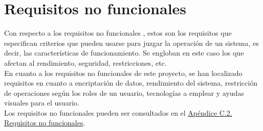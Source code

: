 \section{Requisitos no funcionales}

Con respecto a los requisitos no funcionales \cite{requisitos}, estos son los requisitos que especifican criterios que pueden usarse para juzgar la operación de un sistema, es decir, las características de funcionamiento. Se engloban en este caso los que afectan al rendimiento, seguridad, restricciones, etc. 
\\

En cuanto a los requisitos no funcionales de este proyecto, se han localizado requisitos en cuanto a encriptación de datos, rendimiento del sistema, restricción de operaciones según los roles de un usuario, tecnologías a emplear y ayudas visuales para el usuario.
\\

Los requisitos no funcionales pueden ser consultados en el \hyperref[APRequisitosNoFuncionales]{Apéndice C.2. Requisitos no funcionales}.